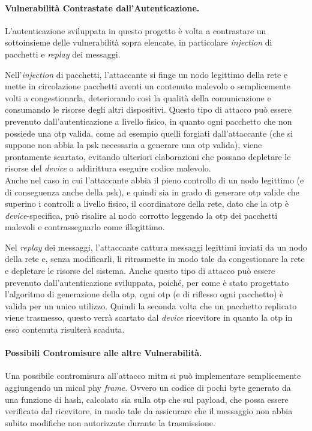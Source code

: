 \paragraph{Vulnerabilità Contrastate dall'Autenticazione.}

L'autenticazione sviluppata in questo progetto è volta a contrastare un sottoinsieme delle vulnerabilità sopra elencate, in particolare \textit{injection} di pacchetti e \textit{replay} dei messaggi.

Nell'\textit{injection} di pacchetti, l'attaccante si finge un nodo legittimo della rete e mette in circolazione pacchetti aventi un contenuto malevolo o semplicemente volti a congestionarla, deteriorando così la qualità della comunicazione e consumando le risorse degli altri dispositivi. Questo tipo di attacco può essere prevenuto dall'autenticazione a livello fisico, in quanto ogni pacchetto che non possiede una \gls{otp} valida, come ad esempio quelli forgiati dall'attaccante (che si suppone non abbia la \gls{psk} necessaria a generare una \gls{otp} valida), viene prontamente scartato, evitando ulteriori elaborazioni che possano depletare le risorse del \textit{device} o addirittura eseguire codice malevolo.\\
Anche nel caso in cui l'attaccante abbia il pieno controllo di un nodo legittimo (e di conseguenza anche della \gls{psk}), e quindi sia in grado di generare \gls{otp} valide che superino i controlli a livello fisico, il coordinatore della rete, dato che la \gls{otp} è \textit{device}-specifica, può risalire al nodo corrotto leggendo la \gls{otp} dei pacchetti malevoli e contrassegnarlo come illegittimo.

Nel \textit{replay} dei messaggi, l'attaccante cattura messaggi legittimi inviati da un nodo della rete e, senza modificarli, li ritrasmette in modo tale da congestionare la rete e depletare le risorse del sistema. Anche questo tipo di attacco può essere prevenuto dall'autenticazione sviluppata, poiché, per come è stato progettato l'algoritmo di generazione della \gls{otp}, ogni \gls{otp} (e di riflesso ogni pacchetto) è valida per un unico utilizzo. Quindi la seconda volta che un pacchetto replicato viene trasmesso, questo verrà scartato dal \textit{device} ricevitore in quanto la \gls{otp} in esso contenuta risulterà scaduta.


\paragraph{Possibili Contromisure alle altre Vulnerabilità.}
Una possibile contromisura all'attacco \gls{mitm} si può implementare semplicemente aggiungendo un \gls{mic}\glsfirstoccur al \gls{phy} \textit{frame}. Ovvero un codice di pochi byte generato da una funzione di hash, calcolato sia sulla \gls{otp} che sul payload, che possa essere verificato dal ricevitore, in modo tale da assicurare che il messaggio non abbia subito modifiche non autorizzate durante la trasmissione.

